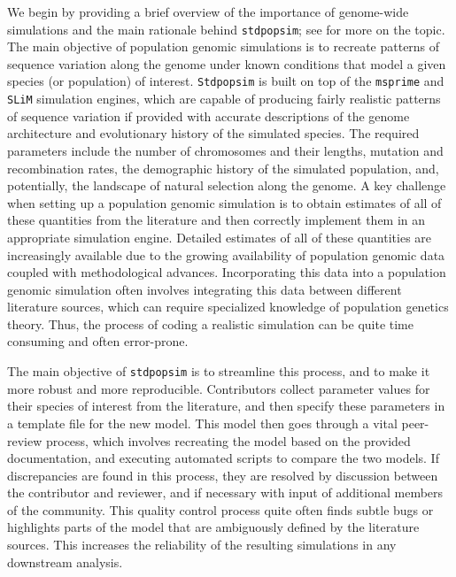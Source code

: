 \documentclass[hidelinks]{article}
\newcommand{\Stdpopsim}{\texttt{Stdpopsim}\xspace}
\newcommand{\stdpopsim}{\texttt{stdpopsim}\xspace}
\begin{document}
We begin by providing a brief overview of the importance of genome-wide simulations and the main rationale behind \stdpopsim;
see \citet{Adrion2020} for more on the topic.
The main objective of population genomic simulations is to recreate 
patterns of sequence variation along the genome under known conditions
that model a given species (or population) of interest.
\Stdpopsim is built on top of the
\texttt{msprime} \citep{Kelleher2016,Nelson2020,Baumdicker2022}
and \texttt{SLiM} \citep{Haller2019} simulation engines,
which are capable of producing fairly realistic patterns of sequence variation
if provided with accurate descriptions of the genome architecture
and evolutionary history of the simulated species.
The required parameters include the number of chromosomes and their lengths,
mutation and recombination rates, the demographic history of the simulated population,
and, potentially, the landscape of natural selection along the genome.
A key challenge when setting up a population genomic simulation is to
obtain estimates of all of these quantities from the literature
and then correctly implement them in an appropriate simulation engine.
Detailed estimates of all of these quantities are increasingly available
due to the growing availability of population genomic data
coupled with methodological advances. Incorporating this data
into a population genomic simulation often involves 
integrating this data between different literature sources, which can
require specialized knowledge of population genetics theory.
Thus, the process of coding a realistic simulation can be quite time consuming and often error-prone.


The main objective of \stdpopsim is to streamline this process,
and to make it more robust and more reproducible.
Contributors collect parameter values for their species of interest from the literature,
and then specify these parameters in a template file for the new model.
This model then goes through a vital peer-review process,
which involves recreating the model based on the provided documentation,
and executing automated scripts to compare the two models.
If discrepancies are found in this process, they are resolved by discussion between the contributor and reviewer,
and if necessary with input of additional members of the community.
This quality control process quite often finds subtle bugs \citep[e.g., as in][]{Ragsdale2020}
or highlights parts of the model that are ambiguously defined by the literature sources.
This increases the reliability of the resulting simulations in any downstream analysis.
\end{document}

